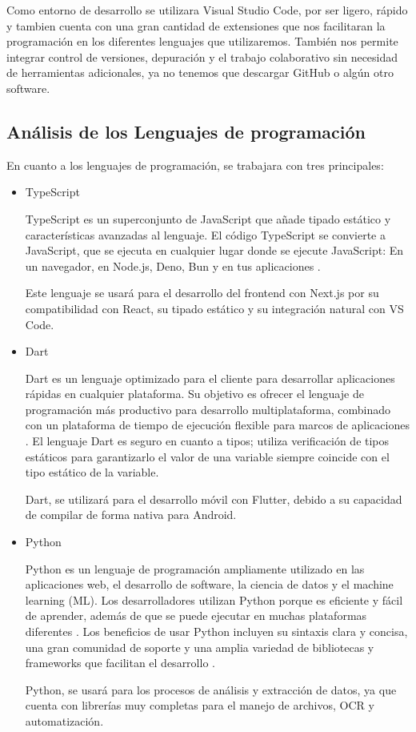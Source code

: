 Como entorno de desarrollo se utilizara Visual Studio Code, por ser ligero, rápido y tambien cuenta con una gran cantidad de extensiones que nos facilitaran la 
programación en los diferentes lenguajes que utilizaremos. También nos permite integrar control de versiones, depuración y el trabajo colaborativo sin necesidad de 
herramientas adicionales, ya no tenemos que descargar GitHub o algún otro software.

\subsection{Análisis de los Lenguajes de programación}

En cuanto a los lenguajes de programación, se trabajara con tres principales:

\begin{itemize}
    \item TypeScript
    
    TypeScript es un superconjunto de JavaScript que añade tipado estático y características avanzadas al lenguaje. El código TypeScript se convierte a JavaScript, que se 
    ejecuta en cualquier lugar donde se ejecute JavaScript: En un navegador, en Node.js, Deno, Bun y en tus aplicaciones \cite{TypeScript}.

    Este lenguaje se usará para el desarrollo del frontend con Next.js por su compatibilidad con React, su tipado estático y su integración natural con VS Code.
    
    \item Dart

    Dart es un lenguaje optimizado para el cliente para desarrollar aplicaciones rápidas en cualquier plataforma. Su objetivo es ofrecer el lenguaje de programación más 
    productivo para desarrollo multiplataforma, combinado con un plataforma de tiempo de ejecución flexible para marcos de aplicaciones \cite{Dart}. El lenguaje Dart es 
    seguro en cuanto a tipos; utiliza verificación de tipos estáticos para garantizarlo el valor de una variable siempre coincide con el tipo estático de la variable.

    Dart, se utilizará para el desarrollo móvil con Flutter, debido a su capacidad de compilar de forma nativa para Android.
    
    \item Python
    
    Python es un lenguaje de programación ampliamente utilizado en las aplicaciones web, el desarrollo de software, la ciencia de datos y el machine learning (ML). 
    Los desarrolladores utilizan Python porque es eficiente y fácil de aprender, además de que se puede ejecutar en muchas plataformas diferentes \cite{Python}.
    Los beneficios de usar Python incluyen su sintaxis clara y concisa, una gran comunidad de soporte y una amplia variedad de bibliotecas y frameworks que facilitan el 
    desarrollo \cite{Python}.

    Python, se usará para los procesos de análisis y extracción de datos, ya que cuenta con librerías muy completas para el manejo de archivos, OCR y automatización.

\end{itemize}


